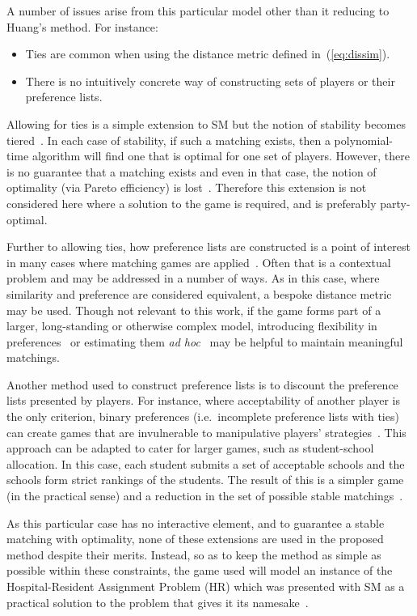 A number of issues arise from this particular model other than it reducing to
Huang's method. For instance:
\begin{itemize}
    \item Ties are common when using the distance metric defined
        in~(\ref{eq:dissim}).
    \item There is no intuitively concrete way of constructing sets of players
        or their preference lists.
\end{itemize}

Allowing for ties is a simple extension to SM but the notion of stability
becomes tiered~\cite{Manlove1999}. In each case of stability, if such a matching
exists, then a polynomial-time algorithm will find one that is optimal for one
set of players. However, there is no guarantee that a matching exists and even
in that case, the notion of optimality (via Pareto efficiency) is
lost~\cite{Erdil2017}. Therefore this extension is not considered here where a
solution to the game is required, and is preferably party-optimal.

Further to allowing ties, how preference lists are constructed is a point of
interest in many cases where matching games are applied~\cite{Iwama2008}. Often
that is a contextual problem and may be addressed in a number of ways. As in
this case, where similarity and preference are considered equivalent, a bespoke
distance metric may be used. Though not relevant to this work, if the game forms
part of a larger, long-standing or otherwise complex model, introducing
flexibility in preferences~\cite{Agarwal2017,Menzel2015} or estimating them
\emph{ad hoc}~\cite{Rastegari2016} may be helpful to maintain meaningful
matchings.

Another method used to construct preference lists is to discount the preference
lists presented by players. For instance, where acceptability of another player
is the only criterion, binary preferences (i.e.\ incomplete preference lists
with ties) can create games that are invulnerable to manipulative players'
strategies~\cite{Bogomolnaia2004}. This approach can be adapted to cater for
larger games, such as student-school allocation. In this case, each student
submits a set of acceptable schools and the schools form strict rankings of the
students. The result of this is a simpler game (in the practical sense) and a
reduction in the set of possible stable matchings~\cite{Haeringer2014}.

As this particular case has no interactive element, and to guarantee a stable
matching with optimality, none of these extensions are used in the proposed
method despite their merits. Instead, so as to keep the method as simple as
possible within these constraints, the game used will model an instance of the
Hospital-Resident Assignment Problem (HR) which was presented with SM as a
practical solution to the problem that gives it its namesake~\cite{Gale1962}.

